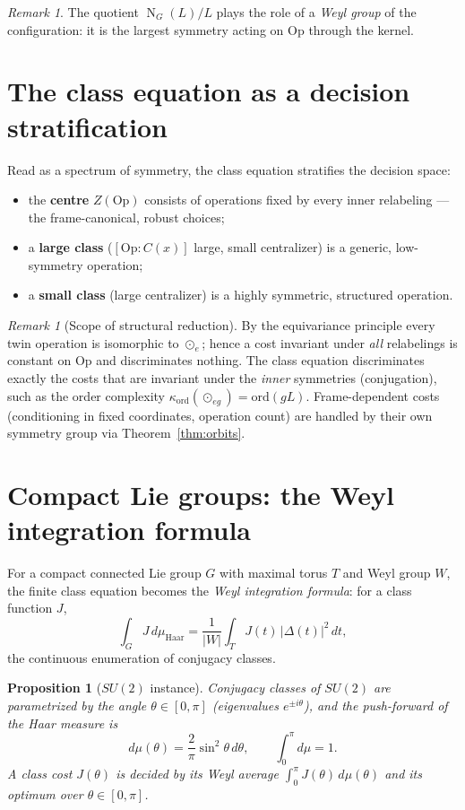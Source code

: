 \documentclass[11pt,a4paper]{article}
\newcommand{\Op}{\mathrm{Op}}
\DeclareMathOperator{\Norm}{N}
\theoremstyle{plain}
\newtheorem{proposition}[theorem]{Proposition}
\theoremstyle{definition}
\theoremstyle{remark}
\newtheorem{remark}[theorem]{Remark}
\begin{document}
\begin{remark}
The quotient $\Norm_G(L)/L$ plays the role of a \emph{Weyl group} of the
configuration: it is the largest symmetry acting on $\Op$ through the kernel.
\end{remark}

\section{The class equation as a decision stratification}

Read as a spectrum of symmetry, the class equation stratifies the decision space:
\begin{itemize}
\item the \textbf{centre} $Z(\Op)$ consists of operations fixed by every inner
relabeling --- the frame-canonical, robust choices;
\item a \textbf{large class} ($[\Op:C(x)]$ large, small centralizer) is a
generic, low-symmetry operation;
\item a \textbf{small class} (large centralizer) is a highly symmetric,
structured operation.
\end{itemize}

\begin{remark}[Scope of structural reduction]
By the equivariance principle every twin operation is isomorphic to $\odot_e$;
hence a cost invariant under \emph{all} relabelings is constant on $\Op$ and
discriminates nothing. The class equation discriminates exactly the costs that
are invariant under the \emph{inner} symmetries (conjugation), such as the order
complexity $\kappa_{\mathrm{ord}}(\odot_{eg}) = \mathrm{ord}(gL)$. Frame-dependent
costs (conditioning in fixed coordinates, operation count) are handled by their
own symmetry group via Theorem~\ref{thm:orbits}.
\end{remark}

\section{Compact Lie groups: the Weyl integration formula}

For a compact connected Lie group $G$ with maximal torus $T$ and Weyl group $W$,
the finite class equation becomes the \emph{Weyl integration formula}: for a
class function $J$,
\[
\int_G J \, d\mu_{\mathrm{Haar}}
= \frac{1}{|W|}\int_T J(t)\,\bigl|\Delta(t)\bigr|^2\, dt,
\]
the continuous enumeration of conjugacy classes.

\begin{proposition}[$SU(2)$ instance]\label{prop:su2}
Conjugacy classes of $SU(2)$ are parametrized by the angle
$\theta\in[0,\pi]$ (eigenvalues $e^{\pm i\theta}$), and the push-forward of the
Haar measure is
\[
d\mu(\theta) = \frac{2}{\pi}\sin^2\theta \, d\theta, \qquad
\int_0^\pi d\mu = 1.
\]
A class cost $J(\theta)$ is decided by its Weyl average
$\int_0^\pi J(\theta)\,d\mu(\theta)$ and its optimum over $\theta\in[0,\pi]$.
\end{proposition}
\end{document}
